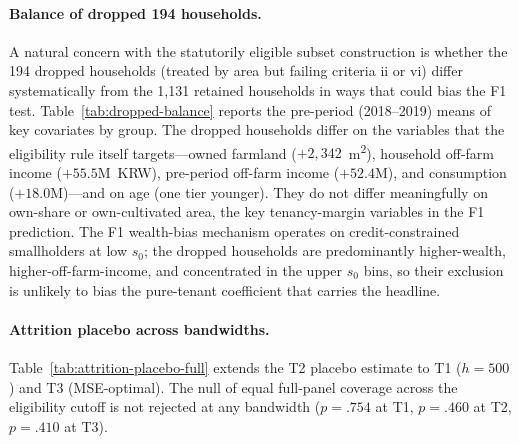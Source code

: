 \documentclass[12pt, a4paper]{article}
\begin{document}


\paragraph{Balance of dropped 194 households.} A natural concern with the statutorily eligible subset construction is whether the 194 dropped households (treated by area but failing criteria ii or vi) differ systematically from the 1,131 retained households in ways that could bias the F1 test. Table~\ref{tab:dropped-balance} reports the pre-period (2018--2019) means of key covariates by group. The dropped households differ on the variables that the eligibility rule itself targets---owned farmland ($+2{,}342$~m\textsuperscript{2}), household off-farm income ($+55.5$M~KRW), pre-period off-farm income ($+52.4$M), and consumption ($+18.0$M)---and on age (one tier younger). They do not differ meaningfully on own-share or own-cultivated area, the key tenancy-margin variables in the F1 prediction. The F1 wealth-bias mechanism operates on credit-constrained smallholders at low $s_0$; the dropped households are predominantly higher-wealth, higher-off-farm-income, and concentrated in the upper $s_0$ bins, so their exclusion is unlikely to bias the pure-tenant coefficient that carries the headline.



\paragraph{Attrition placebo across bandwidths.} Table~\ref{tab:attrition-placebo-full} extends the T2 placebo estimate to T1 ($h=500$) and T3 (MSE-optimal). The null of equal full-panel coverage across the eligibility cutoff is not rejected at any bandwidth ($p = .754$ at T1, $p = .460$ at T2, $p = .410$ at T3).


\end{document}
